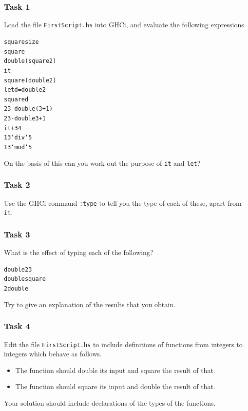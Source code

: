 \subsubsection*{Task 1}
Load the file \texttt{FirstScript.hs} into GHCi, and evaluate 
the following expressions
\begin{alltt}
square size
square
double (square 2)
it
square (double 2)
let d = double 2
square d
23 - double (3+1)
23 - double 3+1
it + 34
13 `div` 5
13 `mod` 5
\end{alltt}
On the basis of this can you work out the purpose of \texttt{it} and \texttt{let}?

\medskip
\noindent
\subsubsection*{Task 2}
Use the GHCi command \texttt{:type} to tell you the type of each of these, 
apart from \texttt{it}.

\medskip
\noindent
\subsubsection*{Task 3}
What is the effect of typing each of the following?
\begin{alltt}
double 2 3
double square
2 double
\end{alltt}
Try to give an explanation of the results that you obtain.

\medskip
\noindent
\subsubsection*{Task 4}
Edit the file \texttt{FirstScript.hs} to include
definitions of functions from integers to integers which behave
as follows.
\begin{itemize}
\item The function should double its input and square the result of
that.
\item The function should square its input and double the result of
that.
\end{itemize}
Your solution should include declarations of the types of the
functions.

\begin{figure}[t]
\end{figure}

